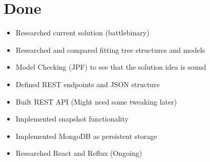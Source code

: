 \documentclass[a4paper,12pt]{article}
\begin{document}
\newpage
\section{Done}
\begin{itemize}
    \item Researched current solution (battlebinary)
    \item Researched and compared fitting tree structures and models
    \item Model Checking (JPF) to see that the solution idea is sound
    \item Defined REST endpoints and JSON structure
    \item Built REST API (Might need some tweaking later)
    \item Implemented snapshot functionality
    \item Implemented MongoDB as persistent storage
    \item Researched React and Reflux (Ongoing)
\end{itemize}
\end{document}
